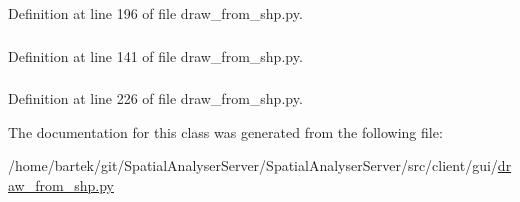 Definition at line 196 of file draw\_\-from\_\-shp.py.

\hypertarget{classsrc_1_1client_1_1gui_1_1draw__from__shp_1_1Ui__DrawFromSHPFile_aa840b67e50053261b20156a4c1fc587c}{
\subsubsection[{rows}]{}}
\label{classsrc_1_1client_1_1gui_1_1draw__from__shp_1_1Ui__DrawFromSHPFile_aa840b67e50053261b20156a4c1fc587c}


Definition at line 141 of file draw\_\-from\_\-shp.py.

\hypertarget{classsrc_1_1client_1_1gui_1_1draw__from__shp_1_1Ui__DrawFromSHPFile_ac7d8951ed8fd5ff091b9ce41e2b61add}{
\subsubsection[{sh}]{}}
\label{classsrc_1_1client_1_1gui_1_1draw__from__shp_1_1Ui__DrawFromSHPFile_ac7d8951ed8fd5ff091b9ce41e2b61add}


Definition at line 226 of file draw\_\-from\_\-shp.py.



The documentation for this class was generated from the following file:\begin{DoxyCompactItemize}
\item 
/home/bartek/git/SpatialAnalyserServer/SpatialAnalyserServer/src/client/gui/\hyperlink{draw__from__shp_8py}{draw\_\-from\_\-shp.py}\end{DoxyCompactItemize}
